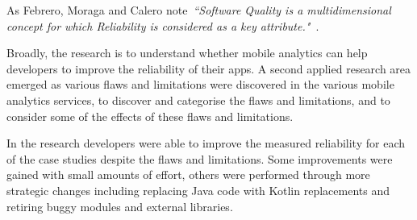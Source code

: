 As Febrero, Moraga and Calero note~\emph{``Software Quality is a multidimensional concept for which Reliability is considered as a key attribute."}~\citep{febrero2017_software_reliability_as_user_perception}.

Broadly, the research is to understand whether mobile analytics can help developers to improve the reliability of their apps. A second applied research area emerged as various flaws and limitations were discovered in the various mobile analytics services, to discover and categorise the flaws and limitations, and to consider some of the effects of these flaws and limitations. 

In the research developers were able to improve the measured reliability for each of the case studies despite the flaws and limitations. Some improvements were gained with small amounts of effort, others were performed through more strategic changes including replacing Java code with Kotlin replacements and retiring buggy modules and external libraries.  

